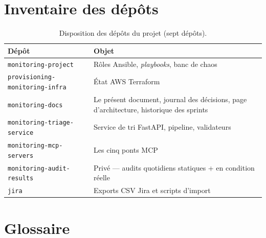 \documentclass[11pt,a4paper,oneside]{report}
\begin{document}
\appendix
\chapter{Inventaire des dépôts}
\label{app:repos}

\begin{table}[h]
\centering
\small
\begin{tabular}{ll}
\toprule
\textbf{Dépôt} & \textbf{Objet} \\
\midrule
\texttt{monitoring-project}            & Rôles Ansible, \emph{playbooks},
                                         banc de chaos \\
\texttt{provisioning-monitoring-infra} & État AWS Terraform \\
\texttt{monitoring-docs}               & Le présent document,
                                         journal des décisions,
                                         page d'architecture,
                                         historique des sprints \\
\texttt{monitoring-triage-service}     & Service de tri FastAPI,
                                         pipeline, validateurs \\
\texttt{monitoring-mcp-servers}        & Les cinq ponts MCP \\
\texttt{monitoring-audit-results}      & Privé --- audits quotidiens
                                         statiques + en condition réelle \\
\texttt{jira}                          & Exports CSV Jira et scripts
                                         d'import \\
\bottomrule
\end{tabular}
\caption{Disposition des dépôts du projet (sept dépôts).}
\label{tab:repos}
\end{table}

\chapter{Glossaire}
\label{app:glossary}
\end{document}
